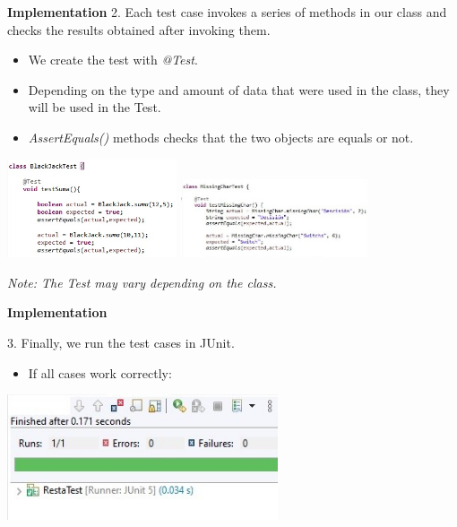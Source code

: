 \documentclass[11pt]{beamer}
\begin{document}
\begin{frame}{\textbf{Implementation}}
2. Each test case invokes a series of methods in our class and checks the results obtained after invoking them.

\begin{itemize}
\item We create the test with \emph{@Test}.
\item Depending on the type and amount of data that were used in the class, they will be used in the Test.
\item \emph{AssertEquals()} methods checks that the two objects are equals or not.
\end{itemize}

\begin{center}
\includegraphics[width=5.0cm]{img/Test2.jpg} \quad \includegraphics[width=5.5cm]{img/Test1.jpeg}
\end{center}

\begin{center}
{\small \textit{Note: The Test may vary depending on the class.}}
\end{center}

\end{frame}


\begin{frame}{\textbf{Implementation}}

3. Finally, we run the test cases in JUnit.

\begin{itemize}
\item If all cases work correctly:
\end{itemize}

\begin{center}
\includegraphics[width=8.0cm]{img/True.jpg}
\end{center}

\end{frame}
\end{document}
